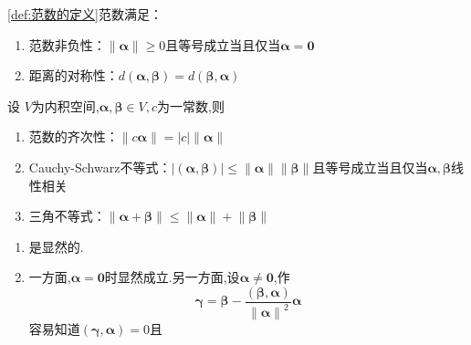 \begin{formal}
    \begin{proposition}[范数的性质]\label{prop:范数的性质}
        \cref{def:范数的定义}范数满足：\begin{enumerate}[label={\textup{(\arabic*)}}]
            \item 范数非负性：$
            \left\lVert \bm{\alpha}\right\rVert \geqslant 0
            $且等号成立当且仅当$\bm{\alpha}=\bm{0}$
            \item 距离的对称性：$d\left(
                \bm{\alpha},\bm{\beta}
            \right)=d\left(
                \bm{\beta},\bm{\alpha}
            \right)$
        \end{enumerate}
    \end{proposition}
\end{formal}
\begin{formal}
    \begin{theorem}[范数的性质]\label{thm:范数的性质}
       设 $V$为内积空间,$\bm{\alpha},\bm{\beta}\in V,c$为一常数,则\begin{enumerate}[label={\textup{(\arabic*)}}]
        \item 范数的齐次性：$\left\lVert c\bm{\alpha}\right\rVert = \left| c\right|\left\lVert \bm{\alpha}\right\rVert$
        \item \textup{Cauchy-Schwarz}不等式：$\left|\left(
            \bm{\alpha},\bm{\beta}
        \right)\right|\leqslant \left\lVert \bm{\alpha}\right\rVert \left\lVert \bm{\beta}\right\rVert$且等号成立当且仅当$\bm{\alpha},\bm{\beta}$线性相关
        \item 三角不等式：$\left\lVert \bm{\alpha}+\bm{\beta}\right\rVert \leqslant \left\lVert \bm{\alpha}\right\rVert +\left\lVert \bm{\beta}\right\rVert$
       \end{enumerate}
    \end{theorem}
    \begin{Proof}
        \begin{enumerate}[label={\textup{(\arabic*)}}]
            \item 是显然的.
            \item 一方面,$\bm{\alpha}=\bm{0}$时显然成立.另一方面,设$\bm{\alpha}\neq\bm{0}$,作\[
            \bm{\gamma}=\bm{\beta}-\frac{
                \left(
                    \bm{\beta},\bm{\alpha}
                \right)
            }{
                \left\lVert \bm{\alpha}\right\rVert ^2
            }\bm{\alpha}
            \]容易知道$\left(
                \bm{\gamma},\bm{\alpha}
            \right)=0$且\begin{align*}

\end{align*}
\end{enumerate}
\end{Proof}
\end{formal}
